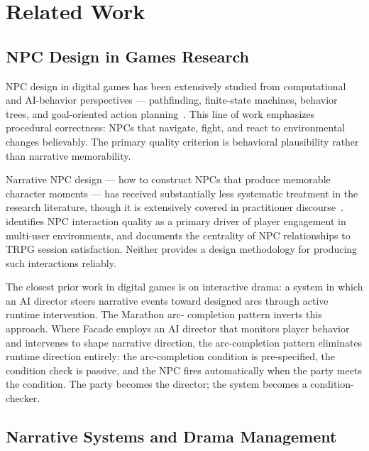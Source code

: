 
\section{Related Work}
\label{sec:related}

\subsection{NPC Design in Games Research}

NPC design in digital games has been extensively studied from computational
and AI-behavior perspectives --- pathfinding, finite-state machines, behavior
trees, and goal-oriented action planning~\cite{buckland2004programming,
millington2009}. This line of work emphasizes procedural correctness: NPCs
that navigate, fight, and react to environmental changes believably. The
primary quality criterion is behavioral plausibility rather than narrative
memorability.

Narrative NPC design --- how to construct NPCs that produce memorable
character moments --- has received substantially less systematic treatment
in the research literature, though it is extensively covered in practitioner
discourse~\cite{dungeons2014players, fullerton2008}. \citet{bartle1996hearts}
identifies NPC interaction quality as a primary driver of player engagement in
multi-user environments, and \citet{tychsen2006role} documents the centrality of
NPC relationships to TRPG session satisfaction. Neither provides a design
methodology for producing such interactions reliably.

The closest prior work in digital games is \citet{mateas2003faade} on
interactive drama: a system in which an AI director steers narrative events
toward designed arcs through active runtime intervention. The Marathon arc-
completion pattern inverts this approach. Where Facade employs an AI director
that monitors player behavior and intervenes to shape narrative direction, the
arc-completion pattern eliminates runtime direction entirely: the arc-completion
condition is pre-specified, the condition check is passive, and the NPC fires
automatically when the party meets the condition. The party becomes the director;
the system becomes a condition-checker.

\subsection{Narrative Systems and Drama Management}

